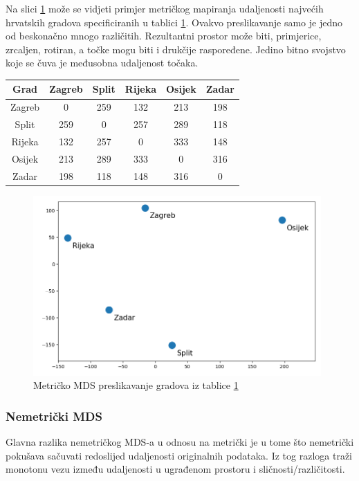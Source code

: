 \documentclass[times, utf8, diplomski]{fer}
\begin{document}
Na slici \ref{fig:mds_mapping_hr_metric} može se vidjeti primjer metričkog mapiranja udaljenosti najvećih hrvatskih gradova specificiranih u tablici \ref{tab:hr_cities}. Ovakvo preslikavanje samo je jedno od beskonačno mnogo različitih. Rezultantni prostor može biti, primjerice, zrcaljen, rotiran, a točke mogu biti i drukčije raspoređene. Jedino bitno svojstvo koje se čuva je međusobna udaljenost točaka.

\begin{table}[htb]
    \centering
    \begin{tabular}{|c|c|c|c|c|c|}
        \hline
        Grad   & Zagreb & Split & Rijeka & Osijek & Zadar \\\hline
        Zagreb & 0      & 259   & 132    & 213    & 198   \\\hline
        Split  & 259    & 0     & 257    & 289    & 118   \\\hline
        Rijeka & 132    & 257   & 0      & 333    & 148   \\\hline
        Osijek & 213    & 289   & 333    & 0      & 316   \\\hline
        Zadar  & 198    & 118   & 148    & 316    & 0     \\\hline
    \end{tabular}
    \label{tab:hr_cities}
\end{table}
\begin{figure}[htb]
    \centering
    \includegraphics[width=11cm]{resources/images/reduction/mds_mapping_hr_metric.png}
    \caption{Metričko MDS preslikavanje gradova iz tablice \ref{tab:hr_cities}}
    \label{fig:mds_mapping_hr_metric}
\end{figure}


\subsubsection{Nemetrički MDS}
Glavna razlika nemetričkog MDS-a  u odnosu na metrički je u tome što nemetrički pokušava sačuvati redoslijed udaljenosti originalnih podataka. Iz tog razloga traži monotonu vezu između udaljenosti u ugrađenom prostoru i sličnosti/različitosti.
\end{document}
